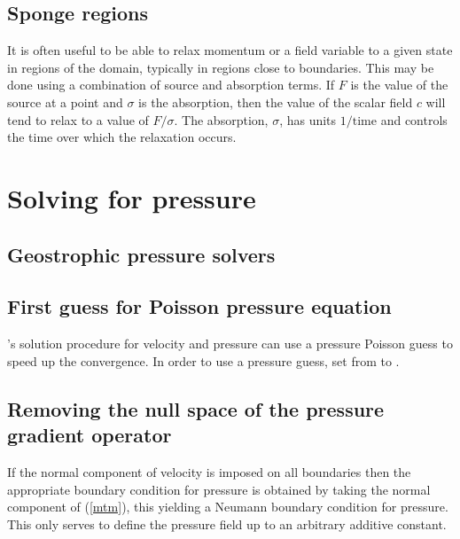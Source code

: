 \subsection{Sponge regions}\label{sec:Sponge}
It is often useful to be able to relax momentum or a field variable to a
given state in regions of the domain, typically in regions close to
boundaries. This may be done using a combination of source and absorption
terms. If $F$ is the value of the source at a point and $\sigma$ is the
absorption, then the value of the scalar field $c$ will tend to relax to a value
of $F/\sigma$. The absorption, $\sigma$, has units $1/\mathrm{time}$ and controls the
time over which the relaxation occurs.

\section{Solving for pressure}
\label{sec:configuring_fluidity_pressure}

\subsection{Geostrophic pressure solvers}
\label{sec:config_geostrophic_balance}

\subsection{First guess for Poisson pressure equation} \label{sec:poisson_pressure_solution}
\fluidity's solution procedure for velocity and pressure can use a pressure Poisson guess to speed up the convergence. In order to use a pressure guess, set  from  to .


\subsection{Removing the null space of the pressure gradient operator} \label{Nullspaceremove}

If the normal component of velocity is imposed on all boundaries then the
appropriate boundary condition for pressure
\citep[see][]{gresho87} is obtained by taking the normal component of
(\ref{mtm}), this yielding a Neumann boundary condition for
pressure. This only serves to define the pressure field up to an
arbitrary additive constant.

